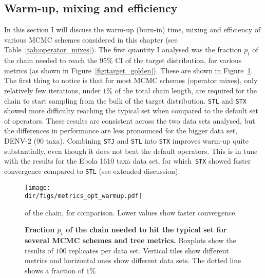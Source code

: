 \subsection{Warm-up, mixing and efficiency}
\label{sec:mcmc_efficiency}

In this section I will discuss the warm-up (burn-in) time, mixing and efficiency of various MCMC schemes considered in this chapter (see Table~\ref{tab:operator_mixes}).
The first quantity I analysed was the fraction $p_t$ of the chain needed to reach the 95\% CI of the target distribution, for various metrics (as shown in Figure~\ref{fig:target_golden}).
These are shown in Figure~\ref{fig:fractions_metrics}.
The first thing to notice is that for most MCMC schemes (operator mixes), only relatively few iterations, under $1\%$ of the total chain length, are required for the chain to start sampling from the bulk of the target distribution.
\verb|STL| and \verb|STX| showed more difficulty reaching the typical set when compared to the default set of operators.
These results are consistent across the two data sets analysed, but the differences in performance are less pronounced for the bigger data set, DENV-2 (90 taxa).
Combining \verb|STJ| and \verb|STL| into \verb|STX| improves warm-up quite substantially, even though it does not beat the default operators.
This is in tune with the results for the Ebola 1610 taxa data set, for which~\verb|STX| showed faster convergence compared to \verb|STL| (see extended discussion).
\begin{figure}[!ht]
\begin{center}
\texttt{[image: \\dir/figs/metrics\_opt\_warmup.pdf]} 
\end{center}
 \caption[Fraction $p_t$ of the chain needed to hit the typical set for several MCMC schemes and tree metrics.]{\textbf{Fraction $p_t$ of the chain needed to hit the typical set for several MCMC schemes and tree metrics.}
  Boxplots show the results of $100$ replicates per data set.
  Vertical tiles show different metrics and horizontal ones show different data sets.
  The dotted line shows a fraction of $1\%$ 
  }
of the chain, for comparison.
  Lower values show faster convergence.
 \label{fig:fractions_metrics}
\end{figure}

